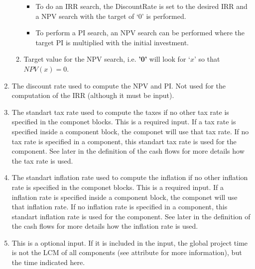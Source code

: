 \begin{enumerate}
\begin{enumerate}
  \begin{itemize}
  \item To do an IRR search, the DiscountRate is set to the desired IRR and a NPV search with the target of ‘0’ is performed.
  \item To perform a PI search, an NPV search can be performed where the target PI is multiplied with the initial investment.
  \end{itemize}


  \item[\xmlAttr{Target}] Target value for the NPV search, i.e. \textbf{'0'} will look for ‘$x$’ so that $NPV(x) = 0$.

  \end{enumerate}

\item[\xmlNode{DiscountRate}] The discount rate used to compute the NPV and PI. Not used for the computation of the IRR (although it must be input).
\item[\xmlNode{tax}] The standart tax rate used to compute the taxes if no other tax rate is specified in the componet blocks. This is a required input. If a tax rate is specified inside a component block, the componet will use that tax rate. If no tax rate is specified in a component, this standart tax rate is used for the component. See later in the definition of the cash flows for more details how the tax rate is used.
\item[\xmlNode{inflation}] The standart inflation rate used to compute the inflation if no other inflation rate is specified in the componet blocks. This is a required input. If a inflation rate is specified inside a component block, the componet will use that inflation rate. If no inflation rate is specified in a component, this standart inflation rate is used for the component. See later in the definition of the cash flows for more details how the inflation rate is used.

\item[\xmlNode{ProjectTime}] This is a optional input. If it is included in the input, the global project time is not the LCM of all components (see  attribute  for more information), but the time indicated here.

\end{enumerate}


\subsection{}

